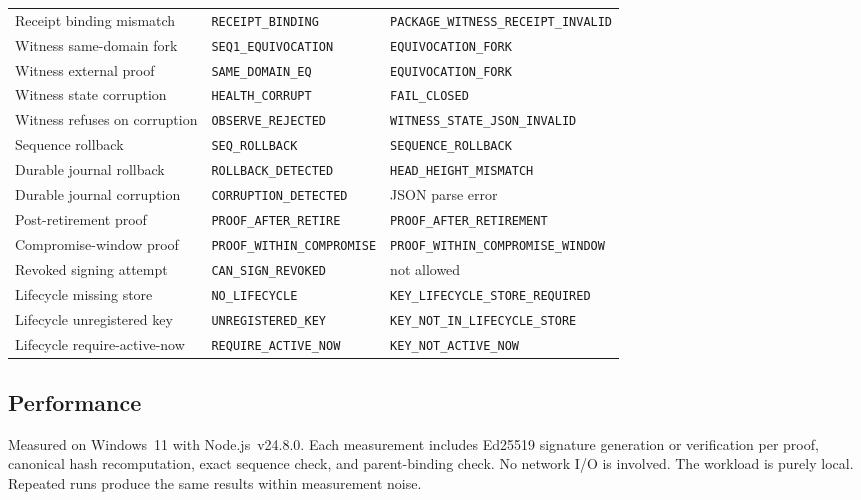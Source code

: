 \documentclass[11pt,a4paper]{article}
\begin{document}
{\begin{longtable}{@{}p{5cm}p{4.5cm}p{5.5cm}@{}}
Receipt binding mismatch & \texttt{RECEIPT\_BINDING} & \texttt{PACKAGE\_WITNESS\_RECEIPT\_INVALID} \\
Witness same-domain fork & \texttt{SEQ1\_EQUIVOCATION} & \texttt{EQUIVOCATION\_FORK} \\
Witness external proof & \texttt{SAME\_DOMAIN\_EQ} & \texttt{EQUIVOCATION\_FORK} \\
Witness state corruption & \texttt{HEALTH\_CORRUPT} & \texttt{FAIL\_CLOSED} \\
Witness refuses on corruption & \texttt{OBSERVE\_REJECTED} & \texttt{WITNESS\_STATE\_JSON\_INVALID} \\
Sequence rollback & \texttt{SEQ\_ROLLBACK} & \texttt{SEQUENCE\_ROLLBACK} \\
Durable journal rollback & \texttt{ROLLBACK\_DETECTED} & \texttt{HEAD\_HEIGHT\_MISMATCH} \\
Durable journal corruption & \texttt{CORRUPTION\_DETECTED} & JSON parse error \\
Post-retirement proof & \texttt{PROOF\_AFTER\_RETIRE} & \texttt{PROOF\_AFTER\_RETIREMENT} \\
Compromise-window proof & \texttt{PROOF\_WITHIN\_COMPROMISE} & \texttt{PROOF\_WITHIN\_COMPROMISE\_WINDOW} \\
Revoked signing attempt & \texttt{CAN\_SIGN\_REVOKED} & not allowed \\
Lifecycle missing store & \texttt{NO\_LIFECYCLE} & \texttt{KEY\_LIFECYCLE\_STORE\_REQUIRED} \\
Lifecycle unregistered key & \texttt{UNREGISTERED\_KEY} & \texttt{KEY\_NOT\_IN\_LIFECYCLE\_STORE} \\
Lifecycle require-active-now & \texttt{REQUIRE\_ACTIVE\_NOW} & \texttt{KEY\_NOT\_ACTIVE\_NOW} \\
\bottomrule
\end{longtable}
}

\subsection{Performance}

Measured on Windows~11 with Node.js~v24.8.0. Each measurement includes Ed25519 signature generation or verification per proof, canonical hash recomputation, exact sequence check, and parent-binding check. No network I/O is involved. The workload is purely local. Repeated runs produce the same results within measurement noise.
\end{document}
